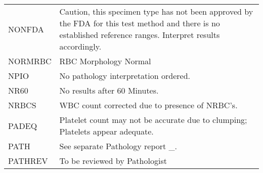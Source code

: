 \begin{fullwidth}
\begin{longtable}{p{.20\linewidth} p{.75\linewidth}}
NONFDA      & Caution, this specimen type has not been approved by the FDA for this test method and there is no established reference ranges. Interpret results accordingly.                                                                                                                               \\
NORMRBC     & RBC Morphology Normal                                                                                                                                                                                                                                                                        \\
NPIO        & No pathology interpretation ordered.                                                                                                                                                                                                                                                         \\
NR60        & No results after 60 Minutes.                                                                                                                                                                                                                                                                 \\
NRBCS       & WBC count corrected due to presence of NRBC's.                                                                                                                                                                                                                                               \\
PADEQ       & Platelet count may not be accurate due to clumping; Platelets appear adequate.                                                                                                                                                                                                               \\
PATH        & See separate Pathology report \_.                                                                                                                                                                                                                                                             \\
PATHREV     & To be reviewed by Pathologist                                                                                                                                                                                                                                                                \\

\end{longtable}
\end{fullwidth}
